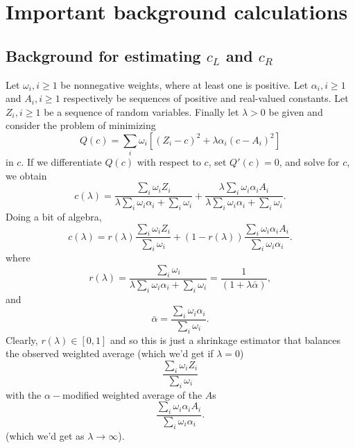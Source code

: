 \documentclass[12pt]{article}
\begin{document}

\section{Important background calculations}
\label{bkgrnd}
\subsection{Background for estimating $c_L$ and $c_R$}
\label{Est}
Let $\omega_i, i \geq 1$ be nonnegative weights, where at least one is
positive. Let $\alpha_i, i \geq 1$ and $A_i, i \geq 1$ respectively be
sequences of positive and real-valued constants. Let $Z_i, i \geq 1$
be a sequence of random variables. Finally let $\lambda > 0$ be given
and consider the problem of minimizing
\[
Q(c) = {\textstyle \sum\nolimits}_i \omega_i \left[ (Z_{i}-c)^2 + \lambda \alpha_i (c-A_i)^2 \right]
\]
in $c$.  If we differentiate $Q(c)$ with respect to $c$, set $Q'(c) = 0$, and solve for $c$, we obtain
\[
c(\lambda) = \frac{\sum_i \omega_i Z_i}{\lambda \sum_i \omega_i \alpha_i + \sum_i \omega_i}
+  \frac{ \lambda \sum_i \omega_i \alpha_i A_i}{\lambda \sum_i \omega_i \alpha_i + \sum_i \omega_i}.
\]
Doing a bit of algebra,
\begin{equation}
\label{clambda}
c(\lambda) = r(\lambda) \frac{\sum_i \omega_i Z_i}{\sum_i \omega_i}
+  (1-r(\lambda)) \frac{ \sum_i \omega_i \alpha_i A_i}{ \sum_i \omega_i \alpha_i }.
\end{equation}
where
\begin{equation}
\label{rlambda}
r(\lambda) = \frac{\sum_i \omega_i}{\lambda \sum_i \omega_i \alpha_i + \sum_i \omega_i}  = 
\frac{1}{(1 + \lambda \bar{\alpha})},
\end{equation}
and
\begin{equation}
\label{baralpha}
 \bar{\alpha} = \frac{\sum_i \omega_i \alpha_i}{\sum_i \omega_i}.
\end{equation}
Clearly, $r(\lambda) \in [0,1]$ and so this is just a shrinkage
estimator that balances the observed weighted average (which we'd get
if $\lambda = 0$)
\[
 \frac{\sum_i \omega_i Z_i}{\sum_i \omega_i}
\]
with the $\alpha-$modified weighted average of the $A$s
\[
\frac{ \sum_i \omega_i \alpha_i A_i}{ \sum_i \omega_i \alpha_i }.
\]
(which we'd get as $\lambda \rightarrow \infty$).
\end{document}
